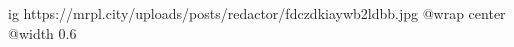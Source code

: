  
 
 
 
 

\ifcmt
  ig https://mrpl.city/uploads/posts/redactor/fdczdkiaywb2ldbb.jpg
  @wrap center
  @width 0.6
\fi
